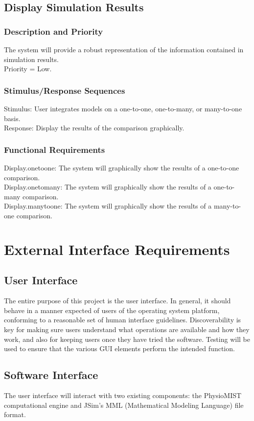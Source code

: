 \documentclass{article}
\begin{document}
\subsection{Display Simulation Results}
\subsubsection{Description and Priority}
The system will provide a robust representation of the information contained in simulation results.\\
Priority = Low.

\subsubsection{Stimulus/Response Sequences}
Stimulus: User integrates models on a one-to-one, one-to-many, or many-to-one basis.\\
Response: Display the results of the comparison graphically.

\subsubsection{Functional Requirements}
Display.onetoone: The system will graphically show the results of a one-to-one comparison.\\
Display.onetomany: The system will graphically show the results of a one-to-many comparison.\\
Display.manytoone: The system will graphically show the results of a many-to-one comparison.

\section{External Interface Requirements}
\subsection{User Interface}
The entire purpose of this project is the user interface. In general, it should behave in a manner expected of users of the operating system platform, conforming to a reasonable set of human interface guidelines. Discoverability is key for making sure users understand what operations are available and how they work, and also for keeping users once they have tried the software. Testing will be used to ensure that the various GUI elements perform the intended function.

\subsection{Software Interface}
The user interface will interact with two existing components: the PhysioMIST computational engine and JSim's MML (Mathematical Modeling Language) file format.
\end{document}
